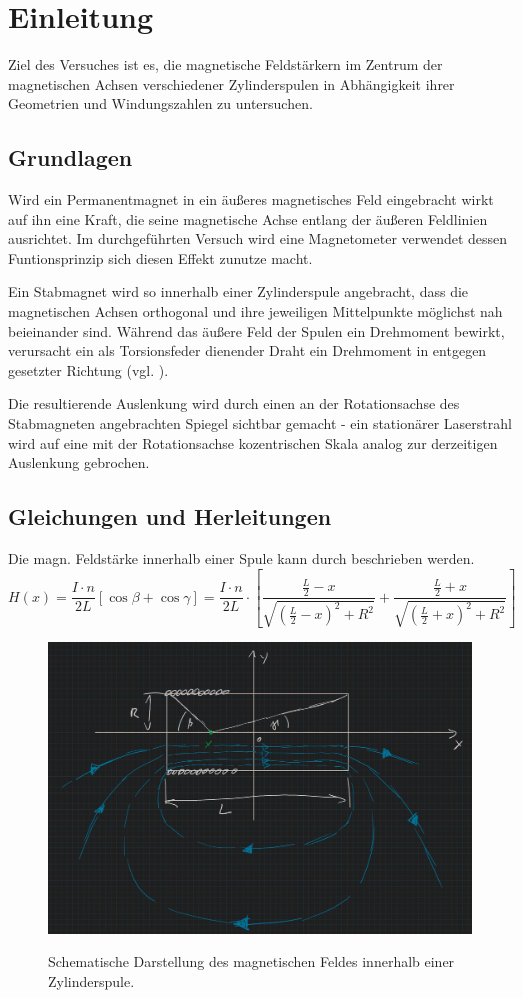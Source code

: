 \chapter{Einleitung}
Ziel des Versuches ist es, die magnetische Feldstärkern im Zentrum der magnetischen Achsen verschiedener Zylinderspulen
in Abhängigkeit ihrer Geometrien und Windungszahlen zu untersuchen.

\section{Grundlagen}
Wird ein Permanentmagnet in ein äußeres magnetisches Feld eingebracht wirkt auf ihn eine Kraft, die seine magnetische
Achse entlang der äußeren Feldlinien ausrichtet. Im durchgeführten Versuch wird eine Magnetometer verwendet dessen
Funtionsprinzip sich diesen Effekt zunutze macht.
\par
\hspace{1cm}Ein Stabmagnet wird so innerhalb einer Zylinderspule angebracht, dass die magnetischen Achsen orthogonal und ihre
jeweiligen Mittelpunkte möglichst nah beieinander sind. Während das äußere Feld der Spulen ein Drehmoment bewirkt,
verursacht ein als Torsionsfeder dienender Draht ein Drehmoment in entgegen gesetzter Richtung (vgl. ).
\par
\hspace{1cm}Die resultierende Auslenkung wird durch einen an der Rotationsachse des Stabmagneten angebrachten Spiegel sichtbar
gemacht - ein stationärer Laserstrahl wird auf eine mit der Rotationsachse kozentrischen Skala analog zur derzeitigen
Auslenkung gebrochen.

\section{Gleichungen und Herleitungen}
Die magn. Feldstärke innerhalb einer Spule kann durch  beschrieben werden.
\begin{equation}
    H(x) = \frac{I \cdot n}{2L} \left[ \cos{\beta} + \cos{\gamma} \right] = \frac{I \cdot n}{2L} \cdot \left[ \frac{ \frac{L}{2} - x}{ \sqrt{ \left(\frac{L}{2} - x \right)^2 + R^2 }} + \frac{ \frac{L}{2} + x}{ \sqrt{ \left(\frac{L}{2} + x \right)^2 + R^2 }} \right]
    \label{eq:1}
\end{equation}

\begin{figure}[h]
    \centering
    \includegraphics[width=.5\textwidth]{assets/feldInSpule.jpg}
    \label{fig:feldInSpule}
    \caption[Feld innerhalb einer Zylinderspule]{Schematische Darstellung des magnetischen Feldes innerhalb einer Zylinderspule.}
\end{figure}

